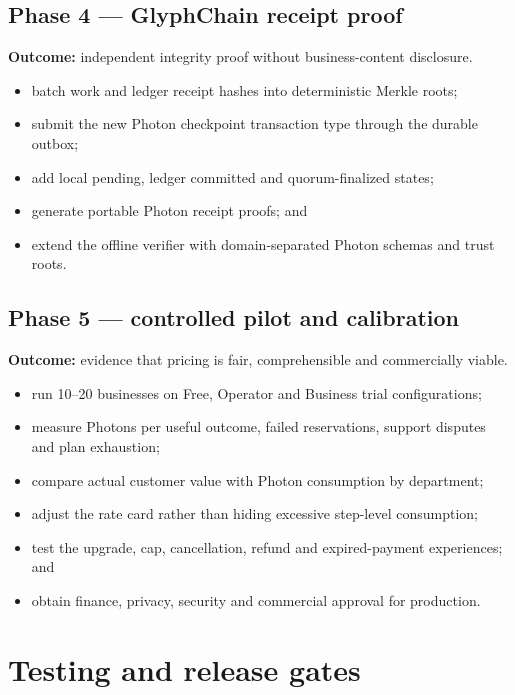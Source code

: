 \documentclass[11pt]{article}
\begin{document}
\subsection{Phase 4 --- GlyphChain receipt proof}

\textbf{Outcome:} independent integrity proof without business-content disclosure.

\begin{itemize}
  \item batch work and ledger receipt hashes into deterministic Merkle roots;
  \item submit the new Photon checkpoint transaction type through the durable outbox;
  \item add local pending, ledger committed and quorum-finalized states;
  \item generate portable Photon receipt proofs; and
  \item extend the offline verifier with domain-separated Photon schemas and trust roots.
\end{itemize}

\subsection{Phase 5 --- controlled pilot and calibration}

\textbf{Outcome:} evidence that pricing is fair, comprehensible and commercially viable.

\begin{itemize}
  \item run 10--20 businesses on Free, Operator and Business trial configurations;
  \item measure Photons per useful outcome, failed reservations, support disputes and plan exhaustion;
  \item compare actual customer value with Photon consumption by department;
  \item adjust the rate card rather than hiding excessive step-level consumption;
  \item test the upgrade, cap, cancellation, refund and expired-payment experiences; and
  \item obtain finance, privacy, security and commercial approval for production.
\end{itemize}

\section{Testing and release gates}
\end{document}
